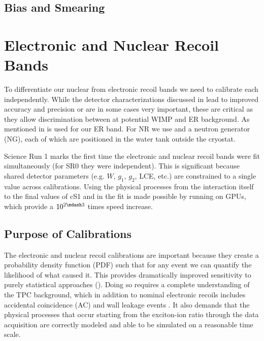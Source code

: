 \subsection{Bias and Smearing}
\label{subsec:det_char_bias_smearing}



\section{Electronic and Nuclear Recoil Bands}
\label{subsec:er_nr_calibrations}
To differentiate our nuclear from electronic recoil bands we need to calibrate each independently.  While the detector characterizations
discussed in  lead to improved accuracy and precision or are in some cases very important, these are critical as
they allow discrimination between at potential WIMP and ER background.  As mentioned in
  is used for our ER band.  For NR we use  and a neutron generator (NG),
each of which are positioned in the water tank outside the cryostat.

Science Run 1 marks the first time the electronic and nuclear recoil bands were fit simultaneously (for SR0 they were independent).  This
is significant because shared detector parameters (e.g. $W$, $g_1$, $g_2$, LCE, etc.) are constrained to a single value
across calibrations.  Using the physical processes from the interaction itself to the final values of cS1 and \cstwob in the fit is made
possible by running on GPUs, which provide a $10^{2 \mdash 3}$ times speed increase.



\subsection{Purpose of Calibrations}
\label{subsec:er_nr_calibrations_purpose}
The electronic and nuclear recoil calibrations are important because they create a probability density function (PDF)
such that for any event we can quantify the likelihood of what caused it.  This provides dramatically improved sensitivity
to purely statistical approaches ().  Doing so requires a complete understanding of the TPC background, which
in addition to nominal electronic recoils includes accidental coincidence (AC) and wall leakage events \secref{}.  It also demands that
the physical processes that occur starting from the exciton-ion ratio through the data acquisition are correctly modeled and able to be
simulated on a reasonable time scale.

